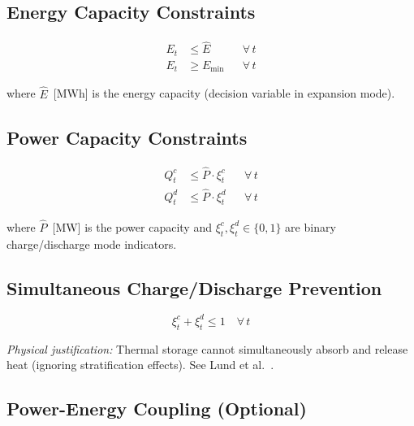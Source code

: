\documentclass[a4paper,12pt]{article}
\begin{document}
\subsection{Energy Capacity Constraints}

\begin{align}
  E_{t} &\leq \hat{E}    && \forall\, t \tag{ST-2} \label{eq:st2} \\
  E_{t} &\geq E_{\min}   && \forall\, t \tag{ST-3} \label{eq:st3}
\end{align}

where $\hat{E}$~[MWh] is the energy capacity (decision variable in expansion mode).

\subsection{Power Capacity Constraints}

\begin{align}
  Q^{c}_{t} &\leq \hat{P} \cdot \xi^{c}_{t} && \forall\, t \tag{ST-4} \label{eq:st4} \\
  Q^{d}_{t} &\leq \hat{P} \cdot \xi^{d}_{t} && \forall\, t \tag{ST-5} \label{eq:st5}
\end{align}

where $\hat{P}$~[MW] is the power capacity and $\xi^{c}_{t}, \xi^{d}_{t} \in \{0,1\}$
are binary charge/discharge mode indicators.

\subsection{Simultaneous Charge/Discharge Prevention}

\begin{equation}
  \xi^{c}_{t} + \xi^{d}_{t} \leq 1
  \quad \forall\, t
  \tag{ST-6}
  \label{eq:st6}
\end{equation}

\noindent\textit{Physical justification:} Thermal storage cannot simultaneously absorb and
release heat (ignoring stratification effects). See Lund et al.~\cite{Lund2007}.

\subsection{Power-Energy Coupling (Optional)}
\end{document}
